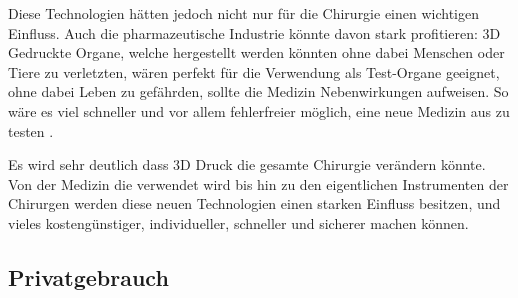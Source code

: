 Diese Technologien hätten jedoch nicht nur für die Chirurgie einen wichtigen Einfluss. Auch die pharmazeutische Industrie könnte davon stark profitieren: 3D Gedruckte Organe, welche hergestellt werden könnten ohne dabei Menschen oder Tiere zu verletzten, wären perfekt für die Verwendung als Test-Organe geeignet, ohne dabei Leben zu gefährden, sollte die Medizin Nebenwirkungen aufweisen. So wäre es viel schneller und vor allem fehlerfreier möglich, eine neue Medizin aus zu testen \parencite{ORGANOVO}. 

Es wird sehr deutlich dass 3D Druck die gesamte Chirurgie verändern könnte. Von der Medizin die verwendet wird bis hin zu den eigentlichen Instrumenten der Chirurgen werden diese neuen Technologien einen starken Einfluss besitzen, und vieles kostengünstiger, individueller, schneller und sicherer machen können.

\newpage
\subsection{Privatgebrauch}
